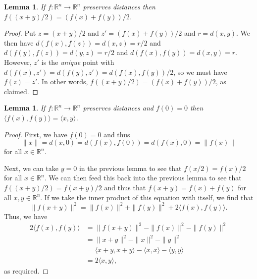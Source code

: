 \documentclass{amsart}
\newcommand{\R}         {{\mathbb{R}}}
\newcommand{\ip}[1]     {\langle #1\rangle}
\newcommand{\xra}       {\xrightarrow}
\renewcommand{\:}       {\colon}
\newtheorem{lemma}[theorem]{Lemma}
\theoremstyle{definition}
\begin{document}
\begin{lemma}
 If $f\:\R^n\xra{}\R^n$ preserves distances then
 $f((x+y)/2)=(f(x)+f(y))/2$.
\end{lemma}
\begin{proof}
 Put $z=(x+y)/2$ and $z'=(f(x)+f(y))/2$ and $r=d(x,y)$.  We then have
 $d(f(x),f(z))=d(x,z)=r/2$ and $d(f(y),f(z))=d(y,z)=r/2$ and
 $d(f(x),f(y))=d(x,y)=r$.  However, $z'$ is the \emph{unique} point
 with $d(f(x),z')=d(f(y),z')=d(f(x),f(y))/2$, so we must have
 $f(z)=z'$.  In other words, $f((x+y)/2)=(f(x)+f(y))/2$, as claimed.
\end{proof}

\begin{lemma}
 If $f\:\R^n\xra{}\R^n$ preserves distances and $f(0)=0$ then
 $\ip{f(x),f(y)}=\ip{x,y}$.
\end{lemma}
\begin{proof}
 First, we have $f(0)=0$ and thus
 \[ \|x\|=d(x,0)=d(f(x),f(0))=d(f(x),0)=\|f(x)\| \]
 for all $x\in\R^n$.

 Next, we can take $y=0$ in the previous lemma to see that
 $f(x/2)=f(x)/2$ for all $x\in\R^n$.  We can then feed this back into
 the previous lemma to see that $f((x+y)/2)=f(x+y)/2$ and thus that
 $f(x+y)=f(x)+f(y)$ for all $x,y\in\R^n$.  If we take the inner
 product of this equation with itself, we find that
 \[ \|f(x+y)\|^2 = \|f(x)\|^2 + \|f(y)\|^2 + 2\ip{f(x),f(y)}. \]
 Thus, we have
 \begin{align*}
  2\ip{f(x),f(y)} &= \|f(x+y)\|^2 - \|f(x)\|^2 - \|f(y)\|^2 \\
                  &= \|x+y\|^2 - \|x\|^2 - \|y\|^2 \\
                  &= \ip{x+y,x+y} - \ip{x,x} - \ip{y,y} \\
                  &= 2\ip{x,y},
 \end{align*}
 as required.
\end{proof}
\end{document}
